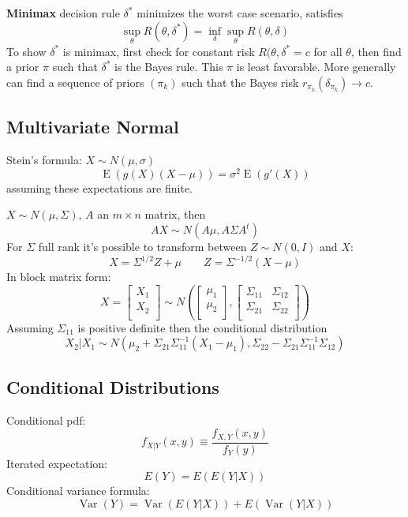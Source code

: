 \documentclass[10pt, twocolumn]{article}
\newcommand{\Expect}{\operatorname{E}}
\newcommand{\Var}{\operatorname{Var}}
\begin{document}
\textbf{Minimax} decision rule $\delta^*$ minimizes the worst case
scenario, satisfies
\[
    \sup_{\theta} R(\theta, \delta^*) = \inf_{\delta} \sup_{\theta}
    R(\theta, \delta)
\]
To show $\delta^*$ is minimax, first check for constant risk $R(\theta,
\delta^* = c$ for all $\theta$, then find a
prior $\pi$ such that $\delta^*$ is the Bayes rule. This $\pi$ is least
favorable. More generally can find
a sequence of priors $(\pi_k)$ such that the Bayes risk $r_{\pi_k}
(\delta_{\pi_k}) \rightarrow c$.

\newpage

\subsection*{Multivariate Normal}

Stein's formula: $X \sim N(\mu, \sigma)$
\[
    \Expect (g(X) (X - \mu)) = \sigma^2 \Expect(g'(X))
\]
assuming these expectations are finite.

$X \sim N(\mu, \Sigma)$, $A$ an $m \times n$ matrix,
then 
\[
    AX \sim N(A \mu, A \Sigma A^t)
\]
For $\Sigma$ full rank it's possible to transform between $Z \sim
N(0, I)$ and $X$:
\[
    X = \Sigma^{1/2} Z + \mu \qquad Z = \Sigma^{-1/2} (X - \mu)
\]
In block matrix form:
\[
    X =
    \begin{bmatrix}
        X_1 \\
        X_2 \\
    \end{bmatrix}
    \sim N \left(
    \begin{bmatrix}
        \mu_1 \\
        \mu_2 \\
    \end{bmatrix}
    ,
    \begin{bmatrix}
        \Sigma_{11} & \Sigma_{12} \\
        \Sigma_{21} & \Sigma_{22} \\
    \end{bmatrix}
\right)
\]
Assuming $\Sigma_{11}$ is positive definite then the conditional
distribution
\[
    X_2 | X_1 \sim N(\mu_2 + \Sigma_{21} \Sigma_{11}^{-1} (X_1 - \mu_1),
    \Sigma_{22} - \Sigma_{21} \Sigma_{11}^{-1} \Sigma_{12})
\]

\subsection*{Conditional Distributions}

Conditional pdf:
\[
    f_{X|Y}(x, y) \equiv \frac{f_{X, Y}(x, y)}{f_Y(y)}
\]
Iterated expectation:
\[
    E(Y) = E(E(Y | X))
\]
Conditional variance formula:
\[
    \Var(Y) = \Var(E(Y | X)) + E(\Var(Y | X))
\]
\end{document}

